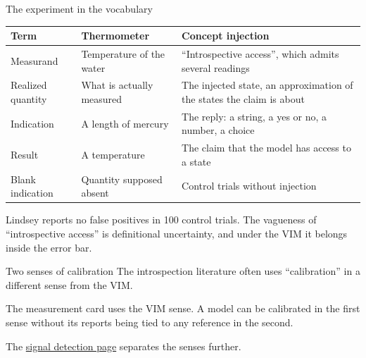 \documentclass[aspectratio=169,11pt]{beamer}
\begin{document}
\begin{frame}[label=mapping]{The experiment in the vocabulary}
\begin{center}
{\footnotesize\renewcommand{\arraystretch}{1.1}
\begin{tabular}{L{2.4cm}L{3.6cm}L{6.4cm}}
\toprule
\textbf{Term} & \textbf{Thermometer} & \textbf{Concept injection} \\
\midrule
Measurand & Temperature of the water & ``Introspective access'', which admits several readings \\
Realized quantity & What is actually measured & The injected state, an approximation of the states the claim is about \\
Indication & A length of mercury & The reply: a string, a yes or no, a number, a choice \\
Result & A temperature & The claim that the model has access to a state \\
Blank indication & Quantity supposed absent & Control trials without injection \\
\bottomrule
\end{tabular}}
\end{center}

\vspace{0.4em}
{\small Lindsey reports no false positives in 100 control trials. The vagueness of ``introspective access'' is definitional uncertainty, and under the VIM it belongs inside the error bar.}
\end{frame}

\begin{frame}[label=twosenses]{Two senses of calibration}
The introspection literature often uses ``calibration'' in a different sense from the VIM.

\vspace{0.5em}
\begin{center}
\end{center}

\vspace{0.5em}
The measurement card uses the VIM sense. A model can be calibrated in the first sense without its reports being tied to any reference in the second.

\vspace{0.3em}
{\small The \href{https://measuring-introspection.github.io/measuring-introspection/foundations/signal-detection/}{signal detection page} separates the senses further.}
\end{frame}
\end{document}

